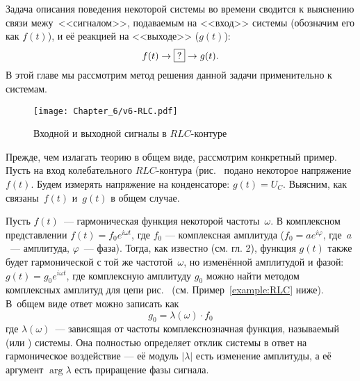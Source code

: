 
Задача описания поведения некоторой системы во времени сводится к выяснению связи
межу~<<сигналом>>, подаваемым на <<вход>> системы (обозначим его как $f(t)$),
и её реакцией на <<выходе>> ($g(t)$):
\begin{equation*}
f(t)\to\fbox{?} \to g(t).
\end{equation*}
В этой главе мы рассмотрим  метод решения данной задачи применительно
к  системам.

\begin{wrapfigure}[10]{o}{0.3\textwidth}
    \centering
    \texttt{[image: Chapter\_6/v6-RLC.pdf]}
    \caption{Входной и выходной сигналы в $RLC$-контуре}
\end{wrapfigure}

Прежде, чем излагать теорию в общем виде, рассмотрим конкретный пример.
Пусть на вход колебательного $RLC$-кон\-ту\-ра (рис.~
подано некоторое напряжение $f(t)$. 
Будем измерять напряжение на конденсаторе: $g(t) = U_C$. 
Выясним, как связаны~$f(t)$ и~$g(t)$ в общем случае.

Пусть $f(t)$~--- гармоническая функция некоторой частоты~$\omega$.
В комплексном представлении $f(t) = f_0 e^{i\omega t}$, где 
$f_0$ --- комплексная амплитуда ($f_0=ae^{i\varphi}$, 
где~$a$~--- амплитуда, $\varphi$~--- фаза).
Тогда, как известно (см. гл. 2),
функция $g(t)$ также будет гармонической с той же частотой~$\omega$, 
но изменённой амплитудой и фазой: $g(t) = g_0 e^{i\omega t}$, где
комплексную амплитуду $g_0$ можно найти методом комплексных амплитуд
для цепи рис.~ (см. Пример~\ref{example:RLC} ниже).
В~общем виде ответ можно записать как
\begin{equation*}
g_0 = \lambda(\omega)\cdot f_0
\end{equation*}
где $\lambda(\omega)$~--- зависящая от частоты комплекснозначная функция,
называемый  (или ) системы.
Она полностью определяет отклик системы в ответ на гармоническое воздействие 
--- её модуль $|\lambda|$ есть изменение амплитуды, а её аргумент
$\arg \lambda$ есть приращение фазы сигнала.

